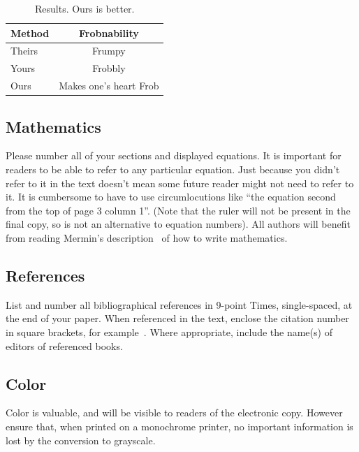\documentclass{bmvc2k}
\begin{document}
\begin{table}
\begin{center}
\begin{tabular}{|l|c|}
\hline
Method & Frobnability \\
\hline\hline
Theirs & Frumpy \\
Yours & Frobbly \\
Ours & Makes one's heart Frob\\
\hline
\end{tabular}
\end{center}
\caption{Results.   Ours is better.}
\end{table}

\subsection{Mathematics}

Please number all of your sections and displayed equations.  It is
important for readers to be able to refer to any particular equation.  Just
because you didn't refer to it in the text doesn't mean some future reader
might not need to refer to it.  It is cumbersome to have to use
circumlocutions like ``the equation second from the top of page 3 column
1''.  (Note that the ruler will not be present in the final copy, so is not
an alternative to equation numbers).  All authors will benefit from reading
Mermin's description~\cite{Mermin89} of how to write mathematics.


\subsection{References}

List and number all bibliographical references in 9-point Times,
single-spaced, at the end of your paper. When referenced in the text,
enclose the citation number in square brackets, for
example~\cite{Authors06}.  Where appropriate, include the name(s) of
editors of referenced books.


\subsection{Color}

Color is valuable, and will be visible to readers of the electronic copy.
However ensure that, when printed on a monochrome printer, no important
information is lost by the conversion to grayscale.

\fi


\end{document}
